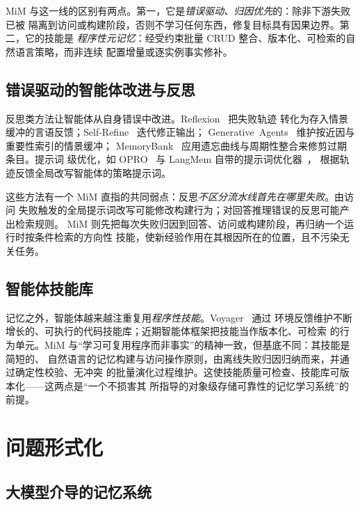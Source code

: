 \documentclass[UTF8,11pt]{ctexart}
\begin{document}
MiM 与这一线的区别有两点。第一，它是\emph{错误驱动、归因优先}的：除非下游失败已被
隔离到访问或构建阶段，否则不学习任何东西，修复目标具有因果边界。第二，它的技能是
\emph{程序性元记忆}：经受约束批量 CRUD 整合、版本化、可检索的自然语言策略，而非连续
配置增量或逐实例事实修补。

\subsection{错误驱动的智能体改进与反思}
\label{sec:rw-reflect}

反思类方法让智能体从自身错误中改进。Reflexion~\cite{shinn2023reflexion} 把失败轨迹
转化为存入情景缓冲的言语反馈；Self-Refine~\cite{madaan2023selfrefine} 迭代修正输出；
Generative~Agents~\cite{park2023generative} 维护按近因与重要性索引的情景缓冲；
MemoryBank~\cite{zhong2024memorybank} 应用遗忘曲线与周期性整合来修剪过期条目。提示词
级优化，如 OPRO~\cite{yang2024opro} 与 LangMem 自带的提示词优化器~\cite{langmem2025}，
根据轨迹反馈全局改写智能体的策略提示词。

这些方法有一个 MiM 直指的共同弱点：反思\emph{不区分流水线首先在哪里失败}。由访问
失败触发的全局提示词改写可能修改构建行为；对回答推理错误的反思可能产出检索规则。
MiM 则先把每次失败归因到回答、访问或构建阶段，再归纳一个运行时按条件检索的方向性
技能，使新经验作用在其根因所在的位置，且不污染无关任务。

\subsection{智能体技能库}
\label{sec:rw-skill}

记忆之外，智能体越来越注重复用\emph{程序性技能}。Voyager~\cite{wang2023voyager} 通过
环境反馈维护不断增长的、可执行的代码技能库；近期智能体框架把技能当作版本化、可检索
的行为单元。MiM 与“学习可复用程序而非事实”的精神一致，但基底不同：其技能是简短的、
自然语言的记忆构建与访问操作原则，由离线失败归因归纳而来，并通过确定性校验、无冲突
的批量演化过程维护。这使技能质量可检查、技能库可版本化——这两点是“一个不损害其
所指导的对象级存储可靠性的记忆学习系统”的前提。

\section{问题形式化}
\label{sec:problem}

\subsection{大模型介导的记忆系统}
\label{sec:prob-sys}
\end{document}
